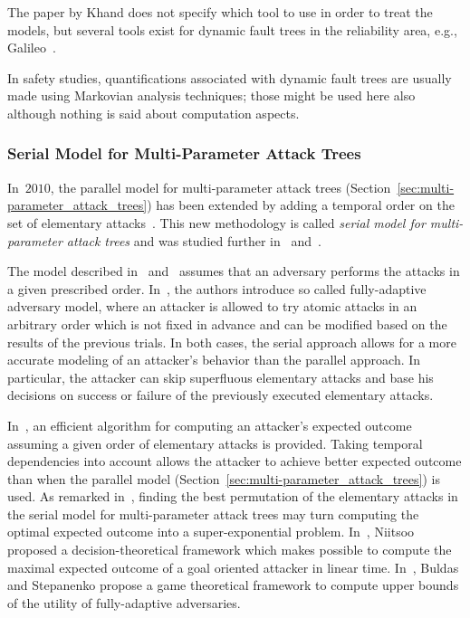 \documentclass[a4paper]{article}
\begin{document}
The paper by Khand does not specify which tool to use in order to treat the
models, but several tools exist for dynamic fault trees in the reliability
area, e.g., Galileo~\cite{DuSuCo}.

In safety studies, quantifications associated with dynamic fault trees are
usually made using Markovian analysis techniques; those might be used here also
although nothing is said about computation aspects.

\subsubsection{Serial Model for Multi-Parameter Attack Trees} 
\label{sec:multi-parameter_attack_trees-serial}

In~$2010$, the parallel model for multi-parameter attack trees
(Section~\ref{sec:multi-parameter_attack_trees}) has been extended by adding a
temporal order on the set of elementary attacks~\cite{WiJu}. This new
methodology is called \emph{serial model for multi-parameter attack trees} and
was studied further in~\cite{Jurg,Niit} and~\cite{BuSt}.

The model described in~\cite{Jurg} and~\cite{Niit} assumes that an adversary
performs the attacks in a given prescribed order. In~\cite{BuSt}, the authors
introduce so called fully-adaptive adversary model, where an attacker is allowed
to try atomic attacks in an arbitrary order which is not fixed in advance and
can be modified based on the results of the previous trials. In both cases, the
serial approach allows for a more accurate modeling of an attacker's behavior
than the parallel approach. In particular, the attacker can skip superfluous
elementary attacks and base his decisions on success or failure of the
previously executed elementary attacks.

In~\cite{WiJu}, an efficient algorithm for computing an attacker's expected
outcome assuming a given order of elementary attacks is provided. Taking
temporal dependencies into account allows the attacker to achieve better
expected outcome than when the parallel model
(Section~\ref{sec:multi-parameter_attack_trees}) is used. As remarked
in~\cite{JuWi2}, finding the best permutation of the elementary attacks in the
serial model for multi-parameter attack trees may turn computing the optimal
expected outcome into a super-exponential problem. In~\cite{Niit}, Niitsoo
proposed a decision-theoretical framework which makes possible to compute the
maximal expected outcome of a goal oriented attacker in linear time.
In~\cite{BuSt}, Buldas and Stepanenko propose a game theoretical framework to
compute upper bounds of the utility of fully-adaptive adversaries.
\end{document}
